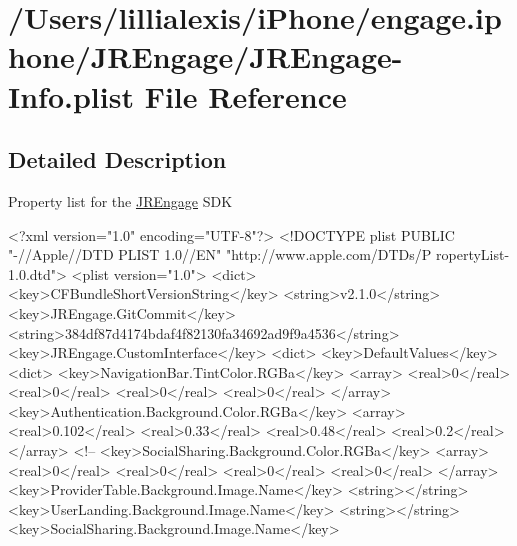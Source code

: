 \hypertarget{_j_r_engage-_info_8plist}{
\section{/Users/lillialexis/iPhone/engage.iphone/JREngage/JREngage-\/Info.plist File Reference}
\label{_j_r_engage-_info_8plist}
}


\subsection{Detailed Description}
Property list for the \hyperlink{interface_j_r_engage}{JREngage} SDK 
\begin{DoxyCodeInclude}
<?xml version="1.0" encoding="UTF-8"?>
<!DOCTYPE plist PUBLIC "-//Apple//DTD PLIST 1.0//EN" "http://www.apple.com/DTDs/P
      ropertyList-1.0.dtd">
<plist version="1.0">
<dict>
        <key>CFBundleShortVersionString</key>
        <string>v2.1.0</string>
        <key>JREngage.GitCommit</key>
        <string>384df87d4174bdaf4f82130fa34692ad9f9a4536</string>
        <key>JREngage.CustomInterface</key>
        <dict>
                <key>DefaultValues</key>
                <dict>
                        <key>NavigationBar.TintColor.RGBa</key>
                        <array>
                                <real>0</real>
                                <real>0</real>
                                <real>0</real>
                                <real>0</real>
                        </array>
                        <key>Authentication.Background.Color.RGBa</key>
                        <array>
                                <real>0.102</real>
                                <real>0.33</real>
                                <real>0.48</real>
                                <real>0.2</real>
                        </array>
<!--
                        <key>SocialSharing.Background.Color.RGBa</key>
                                <array>
                                        <real>0</real>
                                        <real>0</real>
                                        <real>0</real>
                                        <real>0</real>
                                </array>
                        <key>ProviderTable.Background.Image.Name</key>
                        <string></string>
                        <key>UserLanding.Background.Image.Name</key>
                        <string></string>
                        <key>SocialSharing.Background.Image.Name</key>

\end{DoxyCodeInclude}
